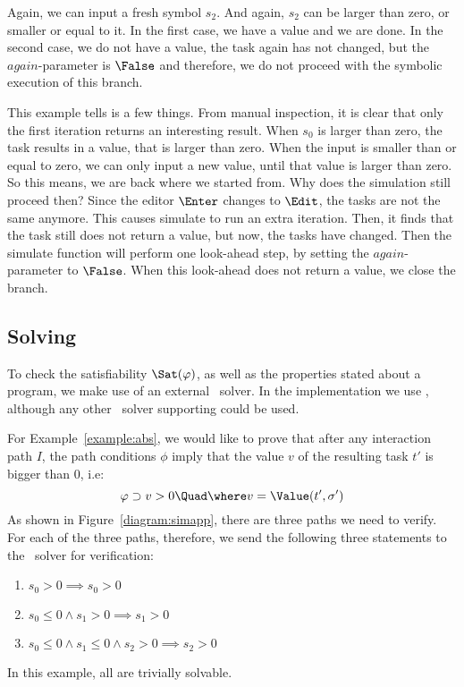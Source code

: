 Again, we can input a fresh symbol $s_2$. And again, $s_2$ can be larger than zero, or smaller or equal to it.
In the first case, we have a value and we are done.
In the second case, we do not have a value, the task again has not changed, but the $\mathit{again}$-parameter is $\False$ and therefore, we do not proceed with the symbolic execution of this branch.

This example tells is a few things.
From manual inspection, it is clear that only the first iteration returns an interesting result.
When $s_0$ is larger than zero, the task results in a value, that is larger than zero.
When the input is smaller than or equal to zero, we can only input a new value, until that value is larger than zero.
So this means, we are back where we started from.
Why does the simulation still proceed then?
Since the editor $\Enter$ changes to $\Edit$, the tasks are not the same anymore.
This causes simulate to run an extra iteration.
Then, it finds that the task still does not return a value, but now, the tasks have changed.
Then the simulate function will perform one look-ahead step, by setting the $\mathit{again}$-parameter to $\False$.
When this look-ahead does not return a value, we close the branch.



\subsection{Solving}

To check the satisfiability $\Sat(\phi)$, as well as the properties stated about a program,
we make use of an external \SMT~solver.
In the implementation we use \ZTHREE,
although any other \SMT~solver supporting \SMTLIB could be used.

For Example~\ref{example:abs}, we would like to prove that after any interaction path $I$,
the path conditions $\phi$ imply that the value $v$ of the resulting task $t'$ is bigger than $0$, i.e:
\begin{equation*}
  \phi \implies v  > 0 \Quad \where v = \Value(t',\sigma')
\end{equation*}
As shown in Figure~\ref{diagram:simapp}, there are three paths we need to verify.
For each of the three paths,
therefore, we send the following three statements to the \SMT~solver for verification:
\begin{enumerate}
  \item $s_0 > 0                                   \implies s_0 > 0  $
  \item $s_0 \leq 0 \land s_1 > 0                  \implies s_1 > 0  $
  \item $s_0 \leq 0 \land s_1 \leq 0 \land s_2 > 0 \implies s_2 > 0  $
\end{enumerate}
In this example, all are trivially solvable.



